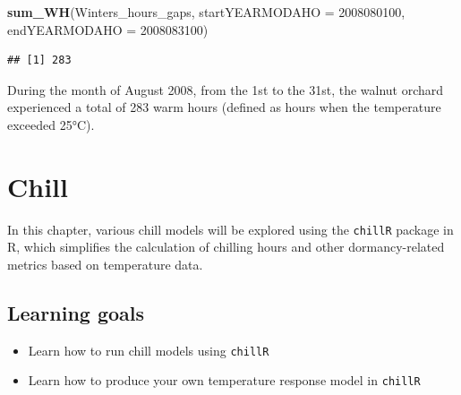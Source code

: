 \documentclass[
]{article}
\newenvironment{Shaded}{\begin{snugshade}}{\end{snugshade}}
\newcommand{\AttributeTok}[1]{\textcolor[rgb]{0.13,0.29,0.53}{#1}}
\newcommand{\DecValTok}[1]{\textcolor[rgb]{0.00,0.00,0.81}{#1}}
\newcommand{\FunctionTok}[1]{\textcolor[rgb]{0.13,0.29,0.53}{\textbf{#1}}}
\newcommand{\NormalTok}[1]{#1}
\newcommand{\OtherTok}[1]{\textcolor[rgb]{0.56,0.35,0.01}{#1}}
\newcommand{\SpecialCharTok}[1]{\textcolor[rgb]{0.81,0.36,0.00}{\textbf{#1}}}
\providecommand{\tightlist}{%
  \setlength{\itemsep}{0pt}\setlength{\parskip}{0pt}}
\begin{document}
\begin{Shaded}
\end{Shaded}

\begin{Shaded}
\begin{Highlighting}[]
\FunctionTok{sum\_WH}\NormalTok{(Winters\_hours\_gaps, }\AttributeTok{startYEARMODAHO =} \DecValTok{2008080100}\NormalTok{, }
                           \AttributeTok{endYEARMODAHO =} \DecValTok{2008083100}\NormalTok{)}
\end{Highlighting}
\end{Shaded}

\begin{verbatim}
## [1] 283
\end{verbatim}

During the month of August 2008, from the 1st to the 31st, the walnut orchard experienced a total of 283 warm hours (defined as hours when the temperature exceeded 25°C).

\section{Chill}\label{chill}

In this chapter, various chill models will be explored using the \texttt{chillR} package in R, which simplifies the calculation of chilling hours and other dormancy-related metrics based on temperature data.

\subsection{Learning goals}\label{learning-goals-4}

\begin{itemize}
\tightlist
\item
  Learn how to run chill models using \texttt{chillR}
\item
  Learn how to produce your own temperature response model in \texttt{chillR}
\end{itemize}
\end{document}
